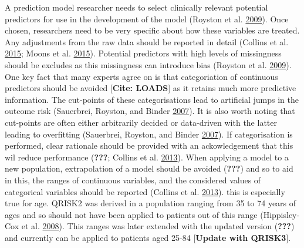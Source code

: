 \documentclass[
]{article}
\begin{document}
A prediction model researcher needs to select clinically relevant potential predictors for use in the development of the model (Royston et al. \protect\hyperlink{ref-royston_prognosis_2009}{2009}). Once chosen, researchers need to be very specific about how these variables are treated. Any adjustments from the raw data should be reported in detail (Collins et al. \protect\hyperlink{ref-collins_transparent_2015}{2015}; Moons et al. \protect\hyperlink{ref-moons_transparent_2015}{2015}). Potential predictors with high levels of missingness should be excludes as this missingness can introduce bias (Royston et al. \protect\hyperlink{ref-royston_prognosis_2009}{2009}). One key fact that many experts agree on is that categoriation of continuous predictors should be avoided {[}\textbf{Cite: LOADS}{]} as it retains much more predictive information. The cut-points of these categorisations lead to artificial jumps in the outcome risk (Sauerbrei, Royston, and Binder \protect\hyperlink{ref-sauerbrei_selection_2007}{2007}). It is also worth noting that cut-points are often either arbitrarily decided or data-driven with the latter leading to overfitting (Sauerbrei, Royston, and Binder \protect\hyperlink{ref-sauerbrei_selection_2007}{2007}). If categorisation is performed, clear rationale should be provided with an ackowledgement that this wil reduce performance ({\textbf{???}}; Collins et al. \protect\hyperlink{ref-collins_systematic_2013}{2013}). When applying a model to a new population, extrapolation of a model should be avoided ({\textbf{???}}) and so to aid in this, the ranges of continuous variables, and the considered values of categorical variables should be reported (Collins et al. \protect\hyperlink{ref-collins_systematic_2013}{2013}). this is especially true for age. QRISK2 was derived in a population ranging from 35 to 74 years of ages and so should not have been applied to patients out of this range (Hippisley-Cox et al. \protect\hyperlink{ref-hippisley-cox_predicting_2008}{2008}). This ranges was later extended with the updated version ({\textbf{???}}) and currently can be applied to patients aged 25-84 {[}\textbf{Update with QRISK3}{]}.
\end{document}
